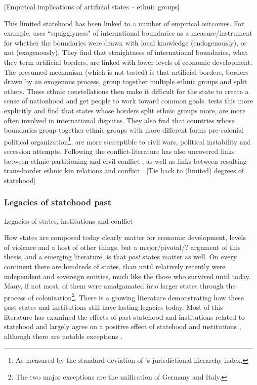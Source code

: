 \documentclass[12pt]{article}
\begin{document}
[Empirical implications of artificial states -- ethnic groups]

This limited statehood has been linked to a number of empirical outcomes. For
example, \citet{Alesina2011} uses ``squigglyness" of international boundaries as
a measure/instrument for whether the boundaries were drawn with local knowledge
(endogenously), or not (exogenously). They find that straightness of
international boundaries, what they term artificial borders, are linked with
lower levels of economic development. The presumed mechanism (which is not
tested) is that artificial borders, borders drawn by an exogenous process, group
together multiple ethnic groups and split others. These ethnic constellations
then make it difficult for the state to create a sense of nationhood and get
people to work toward common goals. \citet{Englebert2002} tests this more
explicitly and find that states whose borders split ethnic groups more, are more
often involved in international disputes. They also find that countries whose
boundaries group together ethnic groups with more different forms pre-colonial
political organization\footnote{As measured by the standard deviation of
\citet{Murdock1967}'s jurisdictional hierarchy index.}, are more susceptible to
civil wars, political instability and secession attempts. Following
\citet{Englebert2002} the conflict-literature has also uncovered links between
ethnic partitioning and civil conflict \citep{Ito2020}, as well as links between
resulting trans-border ethnic kin relations and conflict \citep{Cederman2013,
Salehyan2009, Weidmann2015}. [Tie back to (limited) degrees of statehood]

\subsubsection{Legacies of statehood past} \label{Legacies} 

Legacies of states, institutions and conflict

How states are composed today clearly matter for economic development, levels of
violence and a host of other things, but a major/pivotal/? argument of this
thesis, and a emerging literature, is that \textit{past} states matter as well.
On every continent there are hundreds of states, than until relatively recently
were independent and sovereign entities, much like the those who survived until
today. Many, if not most, of them were amalgamated into larger states through
the process of colonisation\footnote{The two major exceptions are the
unification of Germany and Italy.}. There is a growing literature demonstrating
how these past states and institutions still have lasting legacies today. Most
of this literature has examined the effects of past statehood
\citep{Bockstette2002, Borcan2018} and institutions related to statehood
\citep{Michalopoulos2013, Michalopoulos2018, Englebert2000} and largely agree on
a positive effect of statehood and institutions \citep{Nunn_2020,
Michalopoulos2016}, although there are notable exceptions \citep{Acemoglu_2002}.
\end{document}
